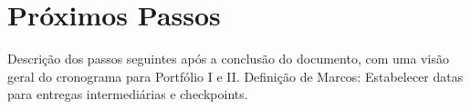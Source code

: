\chapter{Próximos Passos}

Descrição dos passos seguintes após a conclusão do documento, com uma visão geral do cronograma para Portfólio I e II.
Definição de Marcos: Estabelecer datas para entregas intermediárias e checkpoints.